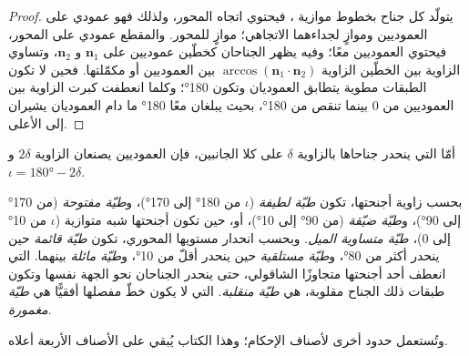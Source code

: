 \begin{proof}
يتولّد كل جناح بخطوط موازية ، فيحتوي اتجاه المحور، ولذلك فهو عمودي على العموديين وموازٍ لجداءهما الاتجاهي؛  موازٍ للمحور. والمقطع عمودي على المحور، فيحتوي العموديين معًا؛ وفيه يظهر الجناحان كخطّين عموديين على $\mathbf n_1$ و
$\mathbf n_2$، وتساوي الزاوية بين الخطّين الزاوية
$\arccos(\mathbf n_1\cdot\mathbf n_2)$ بين العموديين أو مكمّلتها. فحين لا تكون الطبقات مطوية يتطابق العموديان وتكون  \ang{180}؛ وكلما انعطفت  كبرت الزاوية بين العموديين من $0$ بينما تنقص  من \ang{180}، بحيث يبلغان معًا \ang{180} ما دام العموديان يشيران إلى الأعلى.
\end{proof}

أمّا  التي ينحدر جناحاها بالزاوية $\delta$ على كلا الجانبين، فإن العموديين يصنعان الزاوية $2\delta$ و$\iota = \ang{180} - 2\delta$.

\begin{definition}\label{def:b1:faults-folds-fabrics:fold-classes}
بحسب زاوية أجنحتها، تكون  \emph{طيّة لطيفة} ($\iota$ من \ang{180} إلى \ang{170})، و\emph{طيّة مفتوحة} (من \ang{170} إلى \ang{90})، و\emph{طيّة ضيّقة} (من \ang{90} إلى \ang{10})، أو، حين تكون أجنحتها شبه متوازية ($\iota$ من \ang{10} إلى $0$)، \emph{طيّة متساوية الميل}. وبحسب انحدار مستويها المحوري، تكون  \emph{طيّة قائمة} حين ينحدر  أكثر من \ang{80}، و\emph{طيّة مستلقية} حين ينحدر أقلّ من \ang{10}، و\emph{طيّة مائلة} بينهما.  التي انعطف أحد أجنحتها متجاوزًا الشاقولي، حتى ينحدر الجناحان نحو الجهة نفسها وتكون طبقات ذلك الجناح مقلوبة، هي \emph{طيّة منقلبة}.  التي لا يكون خطّ مفصلها أفقيًّا هي \emph{طيّة مغمورة}.
\end{definition}
وتُستعمل حدود أخرى لأصناف الإحكام؛ وهذا الكتاب يُبقي على الأصناف الأربعة أعلاه.

